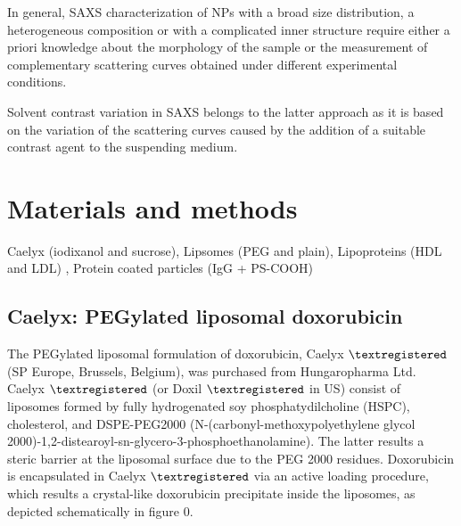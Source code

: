 In general, SAXS characterization of NPs with a broad size distribution, a heterogeneous composition or with a complicated inner structure require either a priori knowledge about the morphology of the sample or the measurement of complementary scattering curves obtained under different experimental conditions. 


Solvent contrast variation in SAXS belongs to the latter approach as it is based on the variation of the scattering curves caused by the addition of a suitable contrast agent to the suspending medium. 


\section{Materials and methods}

Caelyx (iodixanol and sucrose), Lipsomes (PEG and plain), Lipoproteins (HDL and LDL) , Protein coated particles (IgG + PS-COOH)


\subsection{Caelyx: PEGylated liposomal doxorubicin}
The PEGylated liposomal formulation of doxorubicin, Caelyx $\textregistered$ (SP Europe, Brussels, Belgium), was purchased from Hungaropharma Ltd. Caelyx $\textregistered$ (or Doxil $\textregistered$ in US) consist of liposomes formed by fully hydrogenated soy phosphatydilcholine (HSPC), cholesterol, and DSPE-PEG2000 (N-(carbonyl-methoxypolyethylene glycol 2000)-1,2-distearoyl-sn-glycero-3-phosphoethanolamine). The latter results a steric barrier at the liposomal surface due to the PEG 2000 residues. Doxorubicin is encapsulated in Caelyx $\textregistered$ via an active loading procedure, which results a crystal-like doxorubicin precipitate inside the liposomes, as depicted schematically in figure 0. 

